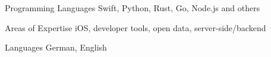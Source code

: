 

\begin{cvskills}

  \cvskill
    {Programming Languages} %
    {Swift, Python, Rust, Go, Node.js and others} %

  \cvskill
    {Areas of Expertise} %
    {iOS, developer tools, open data, server-side/backend} %

  \cvskill
    {Languages} %
    {German, English} %

\end{cvskills}

